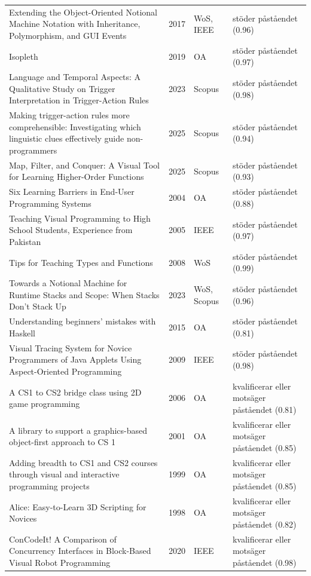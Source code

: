 \begin{longtable}{@{}%
  >{\raggedright\arraybackslash}p{}c%
  >{\raggedright\arraybackslash}p{}%
  >{\raggedright\arraybackslash}p{}@{}}
Extending the Object-Oriented Notional Machine Notation with Inheritance, Polymorphism, and GUI Events & 2017 & WoS, IEEE & stöder påståendet (0.96) \\
Isopleth & 2019 & OA & stöder påståendet (0.97) \\
Language and Temporal Aspects: A Qualitative Study on Trigger Interpretation in Trigger-Action Rules & 2023 & Scopus & stöder påståendet (0.98) \\
Making trigger-action rules more comprehensible: Investigating which linguistic clues effectively guide non-programmers & 2025 & Scopus & stöder påståendet (0.94) \\
Map, Filter, and Conquer: A Visual Tool for Learning Higher-Order Functions & 2025 & Scopus & stöder påståendet (0.93) \\
Six Learning Barriers in End-User Programming Systems & 2004 & OA & stöder påståendet (0.88) \\
Teaching Visual Programming to High School Students, Experience from Pakistan & 2005 & IEEE & stöder påståendet (0.97) \\
Tips for Teaching Types and Functions & 2008 & WoS & stöder påståendet (0.99) \\
Towards a Notional Machine for Runtime Stacks and Scope: When Stacks Don't Stack Up & 2023 & WoS, Scopus & stöder påståendet (0.96) \\
Understanding beginners' mistakes with Haskell & 2015 & OA & stöder påståendet (0.81) \\
Visual Tracing System for Novice Programmers of Java Applets Using Aspect-Oriented Programming & 2009 & IEEE & stöder påståendet (0.98) \\
A CS1 to CS2 bridge class using 2D game programming & 2006 & OA & kvalificerar eller motsäger påståendet (0.81) \\
A library to support a graphics-based object-first approach to CS 1 & 2001 & OA & kvalificerar eller motsäger påståendet (0.85) \\
Adding breadth to CS1 and CS2 courses through visual and interactive programming projects & 1999 & OA & kvalificerar eller motsäger påståendet (0.85) \\
Alice: Easy-to-Learn 3D Scripting for Novices & 1998 & OA & kvalificerar eller motsäger påståendet (0.82) \\
ConCodeIt! A Comparison of Concurrency Interfaces in Block-Based Visual Robot Programming & 2020 & IEEE & kvalificerar eller motsäger påståendet (0.98) \\

\end{longtable}
